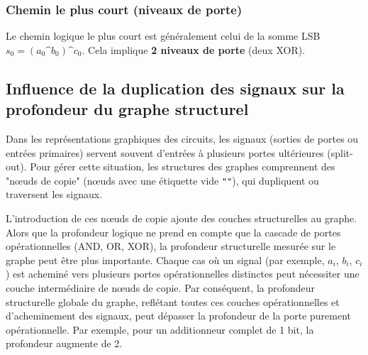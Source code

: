 \subsubsection{Chemin le plus court (niveaux de porte)}
Le chemin logique le plus court est généralement celui de la somme LSB $s_0 = (a_0 \text{\textasciicircum} b_0) \text{\textasciicircum} c_0$. Cela implique \textbf{2 niveaux de porte} (deux XOR).

\subsection{Influence de la duplication des signaux sur la profondeur du graphe structurel}
Dans les représentations graphiques des circuits, les signaux (sorties de portes ou entrées primaires) servent souvent d'entrées à plusieurs portes ultérieures (split-out). Pour gérer cette situation, les structures des graphes comprennent des "nœuds de copie" (nœuds avec une étiquette vide \texttt{""}), qui dupliquent ou traversent les signaux.

L'introduction de ces nœuds de copie ajoute des couches structurelles au graphe. Alors que la profondeur logique ne prend en compte que la cascade de portes opérationnelles (AND, OR, XOR), la profondeur structurelle mesurée sur le graphe peut être plus importante. Chaque cas où un signal (par exemple, $a_i$, $b_i$, $c_i$) est acheminé vers plusieurs portes opérationnelles distinctes peut nécessiter une couche intermédiaire de nœuds de copie. Par conséquent, la profondeur structurelle globale du graphe, reflétant toutes ces couches opérationnelles et d'acheminement des signaux, peut dépasser la profondeur de la porte purement opérationnelle. Par exemple, pour un additionneur complet de 1 bit, la profondeur augmente de 2.

